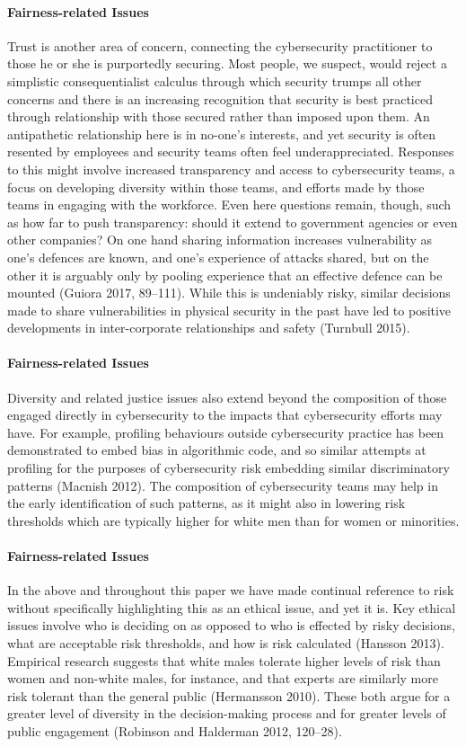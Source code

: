 \documentclass{svjour3}                     %
\begin{document}
\paragraph{Fairness-related Issues}
Trust is another area of concern, connecting the cybersecurity practitioner to those he or she is purportedly securing. Most people, we suspect, would reject a simplistic consequentialist calculus through which security trumps all other concerns and there is an increasing recognition that security is best practiced through relationship with those secured rather than imposed upon them. An antipathetic relationship here is in no-one’s interests, and yet security is often resented by employees and security teams often feel underappreciated. Responses to this might involve increased transparency and access to cybersecurity teams, a focus on developing diversity within those teams, and efforts made by those teams in engaging with the workforce. Even here questions remain, though, such as how far to push transparency: should it extend to government agencies or even other companies? On one hand sharing information increases vulnerability as one’s defences are known, and one’s experience of attacks shared, but on the other it is arguably only by pooling experience that an effective defence can be mounted (Guiora 2017, 89–111). While this is undeniably risky, similar decisions made to share vulnerabilities in physical security in the past have led to positive developments in inter-corporate relationships and safety (Turnbull 2015).

\paragraph{Fairness-related Issues}
Diversity and related justice issues also extend beyond the composition of those engaged directly in cybersecurity to the impacts that cybersecurity efforts may have. For example, profiling behaviours outside cybersecurity practice has been demonstrated to embed bias in algorithmic code, and so similar attempts at profiling for the purposes of cybersecurity risk embedding similar discriminatory patterns (Macnish 2012). The composition of cybersecurity teams may help in the early identification of such patterns, as it might also in lowering risk thresholds which are typically higher for white men than for women or minorities.

\paragraph{Fairness-related Issues}
In the above and throughout this paper we have made continual reference to risk without specifically highlighting this as an ethical issue, and yet it is. Key ethical issues involve who is deciding on as opposed to who is effected by risky decisions, what are acceptable risk thresholds, and how is risk calculated (Hansson 2013). Empirical research suggests that white males tolerate higher levels of risk than women and non-white males, for instance, and that experts are similarly more risk tolerant than the general public (Hermansson 2010). These both argue for a greater level of diversity in the decision-making process and for greater levels of public engagement (Robinson and Halderman 2012, 120–28).
\end{document}
